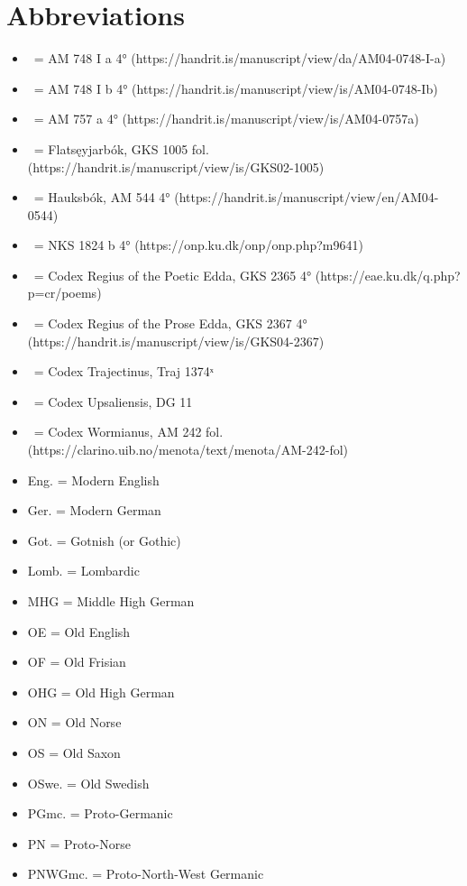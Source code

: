 \thispagestyle{empty}\section{Abbreviations}
  \begin{itemize}%
    \item \AM\ = AM 748 I a 4° (https://handrit.is/manuscript/view/da/AM04-0748-I-a)
    \item \AMb\ = AM 748 I b 4° (https://handrit.is/manuscript/view/is/AM04-0748-Ib)
    \item \EddaBms\ = AM 757 a 4° (https://handrit.is/manuscript/view/is/AM04-0757a)
    \item \FlatMS\ = Flatsęyjarbók, GKS 1005 fol. (https://handrit.is/manuscript/view/is/GKS02-1005)
    \item \Hauksbok\ = Hauksbók, AM 544 4° (https://handrit.is/manuscript/view/en/AM04-0544)
    \item \VolsungaMS\ = NKS 1824 b 4° (https://onp.ku.dk/onp/onp.php?m9641)
    \item \Regius\ = Codex Regius of the Poetic Edda, GKS 2365 4° (https://eae.ku.dk/q.php?p=cr/poems)
    \item \RegiusProse\ = Codex Regius of the Prose Edda, GKS 2367 4° (https://handrit.is/manuscript/view/is/GKS04-2367)
    \item \Trajectinus\ = Codex Trajectinus, Traj 1374ˣ
    \item \Upsaliensis\ = Codex Upsaliensis, DG 11
    \item \Wormianus\ = Codex Wormianus, AM 242 fol. (https://clarino.uib.no/menota/text/menota/AM-242-fol)
  \end{itemize}

  \begin{itemize}%
    \item Eng. = Modern English
    \item Ger. = Modern German
    \item Got. = Gotnish (or Gothic)
    \item Lomb. = Lombardic
    \item MHG = Middle High German
    \item OE = Old English
    \item OF = Old Frisian
    \item OHG = Old High German
    \item ON = Old Norse
    \item OS = Old Saxon
    \item OSwe. = Old Swedish
    \item PGmc. = Proto-Germanic
    \item PN = Proto-Norse
    \item PNWGmc. = Proto-North-West Germanic
  \end{itemize}

